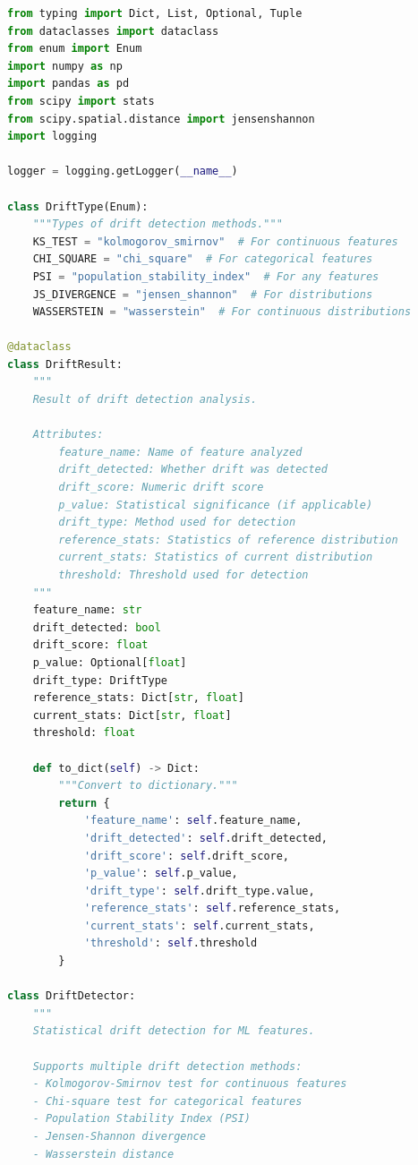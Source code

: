 \begin{lstlisting}[language=Python, caption={Comprehensive Drift Detection System}]
from typing import Dict, List, Optional, Tuple
from dataclasses import dataclass
from enum import Enum
import numpy as np
import pandas as pd
from scipy import stats
from scipy.spatial.distance import jensenshannon
import logging

logger = logging.getLogger(__name__)

class DriftType(Enum):
    """Types of drift detection methods."""
    KS_TEST = "kolmogorov_smirnov"  # For continuous features
    CHI_SQUARE = "chi_square"  # For categorical features
    PSI = "population_stability_index"  # For any features
    JS_DIVERGENCE = "jensen_shannon"  # For distributions
    WASSERSTEIN = "wasserstein"  # For continuous distributions

@dataclass
class DriftResult:
    """
    Result of drift detection analysis.

    Attributes:
        feature_name: Name of feature analyzed
        drift_detected: Whether drift was detected
        drift_score: Numeric drift score
        p_value: Statistical significance (if applicable)
        drift_type: Method used for detection
        reference_stats: Statistics of reference distribution
        current_stats: Statistics of current distribution
        threshold: Threshold used for detection
    """
    feature_name: str
    drift_detected: bool
    drift_score: float
    p_value: Optional[float]
    drift_type: DriftType
    reference_stats: Dict[str, float]
    current_stats: Dict[str, float]
    threshold: float

    def to_dict(self) -> Dict:
        """Convert to dictionary."""
        return {
            'feature_name': self.feature_name,
            'drift_detected': self.drift_detected,
            'drift_score': self.drift_score,
            'p_value': self.p_value,
            'drift_type': self.drift_type.value,
            'reference_stats': self.reference_stats,
            'current_stats': self.current_stats,
            'threshold': self.threshold
        }

class DriftDetector:
    """
    Statistical drift detection for ML features.

    Supports multiple drift detection methods:
    - Kolmogorov-Smirnov test for continuous features
    - Chi-square test for categorical features
    - Population Stability Index (PSI)
    - Jensen-Shannon divergence
    - Wasserstein distance


\end{lstlisting}
